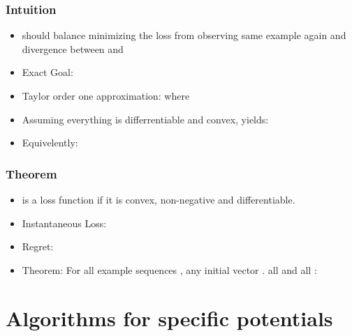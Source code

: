 \documentclass[handout]{beamer}
\begin{document}
\begin{frame}
  \frametitle{Intuition}
  \begin{itemize}
  \item \R{$\vu$} should balance minimizing the loss from observing same example again
    and divergence between \R{$\vu$} and 
  \item Exact Goal:
  \item Taylor order one approximation:
     where \\
    \item Assuming everything is differrentiable and convex,  yields:
    \item Equivelently: 
  \end{itemize}
\end{frame}

\begin{frame}
  \frametitle{Theorem}
  \begin{itemize}
  \item \R{$\ell:\real \times \real \to \real$} is a 
    loss function if it is convex, non-negative and differentiable.
  \item Instantaneous Loss: 
  \item Regret: 
  \item Theorem: For all example sequences
    , any initial vector
    . all  and all :
  \end{itemize}
\end{frame}

\section{Algorithms for specific potentials}
\end{document}
